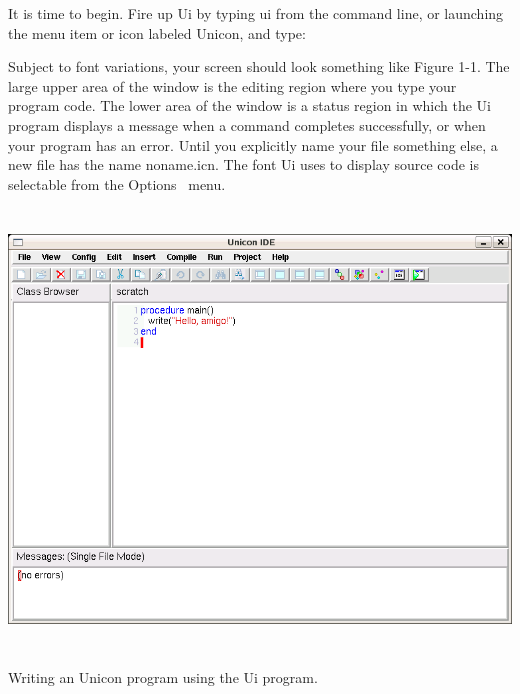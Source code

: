It is time to begin. Fire up Ui by typing
{\textquotedbl}ui{\textquotedbl} from the command line, or launching
the menu item or icon labeled {\textquotedbl}Unicon,{\textquotedbl} and
type:


Subject to font variations, your screen should look
something like Figure 1-1. The large upper area of the window is the
editing region where you type your program code. The lower area of the
window is a status region in which the Ui program displays a message
when a command completes successfully, or when your program has an
error. Until you explicitly name your file something else, a new file
has the name \textsf{noname.icn}. The font Ui uses to display
source code is selectable from the Options \ menu.


\begin{center}
\includegraphics[width=6in,height=4.5953in]{ub-img/ub-img5.png}
\end{center}
\vspace{-0.25cm}{\sffamily\bfseries Figure 1-1:}
{\sffamily Writing an Unicon program using the Ui program.}

\bigskip

